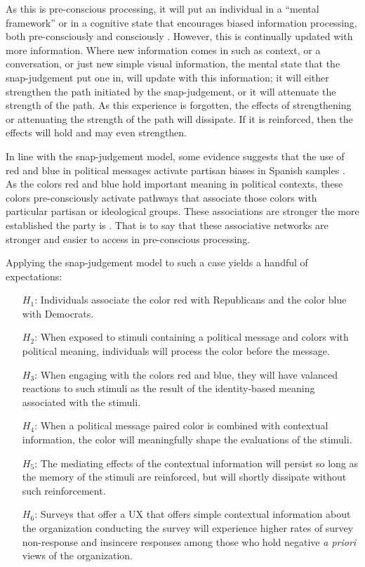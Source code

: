 \documentclass [12pt]{article}
\begin{document}
As this is pre-conscious processing, it will put an individual in a ``mental framework'' or in a cognitive state that encourages biased information processing, both pre-consciously and consciously \citep{lodge_taber_2013_cup}. However, this is continually updated with more information. Where new information comes in such as context, or a conversation, or just new simple visual information, the mental state that the snap-judgement put one in, will update with this information; it will either strengthen the path initiated by the snap-judgement, or it will attenuate the strength of the path. As this experience is forgotten, the effects of strengthening or attenuating the strength of the path will dissipate. If it is reinforced, then the effects will hold and may even strengthen.

In line with the snap-judgement model, some evidence suggests that the use of red and blue in political messages activate partisan biases in Spanish samples \citep{maestre_medero_2022_pr}. As the colors red and blue hold important meaning in political contexts, these colors pre-consciously activate pathways that associate those colors with particular partisan or ideological groups. These associations are stronger the more established the party is \citep{casiraghi_et-al_2022_pp}. That is to say that these associative networks are stronger and easier to access in pre-conscious processing. 

Applying the snap-judgement model to such a case yields a handful of expectations:
\begin{itemize}
    \item[$H_1$:] Individuals associate the color red with Republicans and the color blue with Democrats.
    \item[$H_2$:] When exposed to stimuli containing a political message and colors with political meaning, individuals will process the color before the message.
    \item[$H_3$:] When engaging with the colors red and blue, they will have valanced reactions to such stimuli as the result of the identity-based meaning associated with the stimuli.
    \item[$H_4$:] When a political message paired color is combined with contextual information, the color will meaningfully shape the evaluations of the stimuli.
    \item[$H_5$:] The mediating effects of the contextual information will persist so long as the memory of the stimuli are reinforced, but will shortly dissipate without such reinforcement.
    \item[$H_6$:] Surveys that offer a UX that offers simple contextual information about the organization conducting the survey will experience higher rates of survey non-response and insincere responses among those who hold negative \textit{a priori} views of the organization.
\end{itemize}
\end{document}
